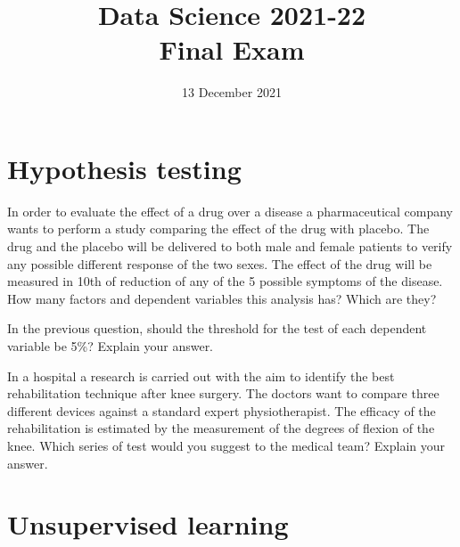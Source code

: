 \documentclass[11pt]{article}
\title{
\vspace{-1.2cm}
Data Science 2021-22\\ Final Exam}
\author{13 December 2021}
\date{}%
\newcounter{marks}
\begin{document}
\maketitle


\section*{Hypothesis testing}
\begin{list}{{\bf Question 1.:}}
	{
	}

\item
{}
\addtocounter{marks}{1}
In order to evaluate the effect of a drug over a disease a pharmaceutical company wants to perform a study comparing the effect of the drug with placebo. The drug and the placebo will be delivered to both male and female patients to verify any possible different response of the two sexes. The effect of the drug will be measured in 10th of reduction of any of the 5 possible symptoms of the disease. How many factors and dependent variables this analysis has? Which are they?

\item
{}
\addtocounter{marks}{1}
In the previous question, should the threshold for the test of each dependent variable be 5\%? Explain your answer.

\item
{}
\addtocounter{marks}{1}
In a hospital a research is carried out with the aim to identify the best rehabilitation technique after knee surgery. The doctors want to compare three different devices against a standard expert physiotherapist. The efficacy of the rehabilitation is estimated by the measurement of the degrees of flexion of the knee. Which series of test would you suggest to the medical team? Explain your answer.

\end{list}


\section*{Unsupervised learning}
\begin{list}{{\bf Question 2.:}}
	{
	}

\item
{}
\addtocounter{marks}{1}


\item
{}
\addtocounter{marks}{1}

\end{list}
\end{document}

